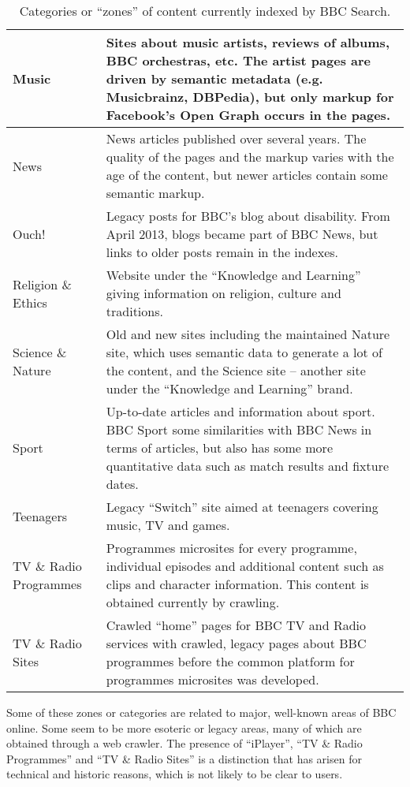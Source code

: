 \begin{sidewaystable}
\begin{tabular}{| p{5cm} | p{16cm} |}
  \hline
  Music                  &  Sites about music artists, reviews of albums, BBC orchestras, etc. The artist pages are driven by semantic metadata (e.g. Musicbrainz, DBPedia), but only markup for Facebook's Open Graph occurs in the pages.\\
  \hline
  News                   &  News articles published over several years. The quality of the pages and the markup varies with the age of the content, but newer articles contain some semantic markup. \\
  \hline
  Ouch!                  &  Legacy posts for BBC's blog about disability. From April 2013, blogs became part of BBC News, but links to older posts remain in the indexes. \\
  \hline
  Religion \& Ethics     &  Website under the ``Knowledge and Learning'' giving information on religion, culture and traditions. \\
  \hline
  Science \& Nature      &  Old and new sites including the maintained Nature site, which uses semantic data to generate a lot of the content\cite{raimond2010use}, and the Science site -- another site under the ``Knowledge and Learning'' brand. \\
  \hline
  Sport                  &  Up-to-date articles and information about sport. BBC Sport some similarities with BBC News in terms of articles, but also has some more quantitative data such as match results and fixture dates. \\
  \hline
  Teenagers              &  Legacy ``Switch'' site aimed at teenagers covering music, TV and games. \\
  \hline
  TV \& Radio Programmes &  Programmes microsites for every programme, individual episodes and additional content such as clips and character information. This content is obtained currently by crawling. \\
  \hline
  TV \& Radio Sites      &  Crawled ``home'' pages for BBC TV and Radio services with crawled, legacy pages about BBC programmes before the common platform for programmes microsites was developed.\cite{raimond2010use} \\
  \hline
\end{tabular}
\caption{Categories or ``zones'' of content currently indexed by BBC Search.}
\label{zones-table}
\end{sidewaystable}

Some of these zones or categories are related to major, well-known areas of
BBC online. Some seem to be more esoteric or legacy areas, many of which
are obtained through a web crawler. The presence of ``iPlayer'',
``TV \& Radio Programmes'' and ``TV \& Radio Sites'' is a distinction that
has arisen for technical and historic reasons, which is not likely to be
clear to users.

